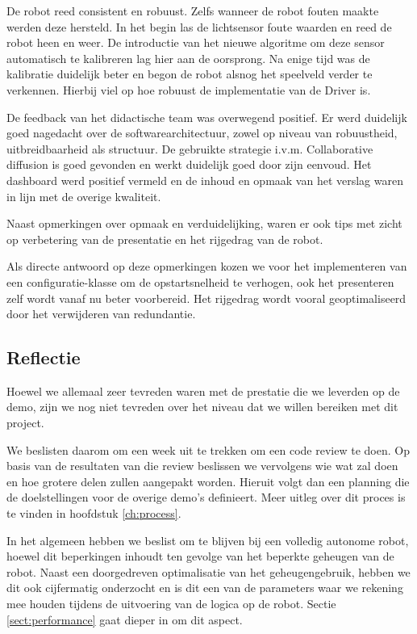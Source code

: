 \documentclass[12pt,a4paper]{report}
\begin{document}
De robot reed consistent en robuust. Zelfs wanneer de robot fouten maakte werden deze hersteld. In het begin las de lichtsensor foute waarden en reed de robot heen en weer. De introductie van het nieuwe algoritme om deze sensor automatisch te kalibreren lag hier aan de oorsprong. Na enige tijd was de kalibratie duidelijk beter en begon de robot alsnog het speelveld verder te verkennen. Hierbij viel op hoe robuust de implementatie van de Driver is.

De feedback van het didactische team was overwegend positief. Er werd duidelijk goed nagedacht over de softwarearchitectuur, zowel op niveau van robuustheid, uitbreidbaarheid als structuur. De gebruikte strategie i.v.m. Collaborative diffusion is goed gevonden en werkt duidelijk goed door zijn eenvoud. Het dashboard werd positief vermeld en de inhoud en opmaak van het verslag waren in lijn met de overige kwaliteit.

Naast opmerkingen over opmaak en verduidelijking, waren er ook tips met zicht op verbetering van de presentatie en het rijgedrag van de robot.

Als directe antwoord op deze opmerkingen kozen we voor het implementeren van een configuratie-klasse om de opstartsnelheid te verhogen, ook het presenteren zelf wordt vanaf nu beter voorbereid. Het rijgedrag wordt vooral geoptimaliseerd door het verwijderen van redundantie.

\subsection{Reflectie}

Hoewel we allemaal zeer tevreden waren met de prestatie die we leverden op de demo, zijn we nog niet tevreden over het niveau dat we willen bereiken met dit project.

We beslisten daarom om een week uit te trekken om een code review te doen. Op basis van de resultaten van die review beslissen we vervolgens wie wat zal doen en hoe grotere delen zullen aangepakt worden. Hieruit volgt dan een planning die de doelstellingen voor de overige demo's definieert. Meer uitleg over dit proces is te vinden in hoofdstuk \ref{ch:process}.

In het algemeen hebben we beslist om te blijven bij een volledig autonome robot, hoewel dit beperkingen inhoudt ten gevolge van het beperkte geheugen van de robot. Naast een doorgedreven optimalisatie van het geheugengebruik, hebben we dit ook cijfermatig onderzocht en is dit een van de parameters waar we rekening mee houden tijdens de uitvoering van de logica op de robot. Sectie \ref{sect:performance} gaat dieper in om dit aspect.
\end{document}
